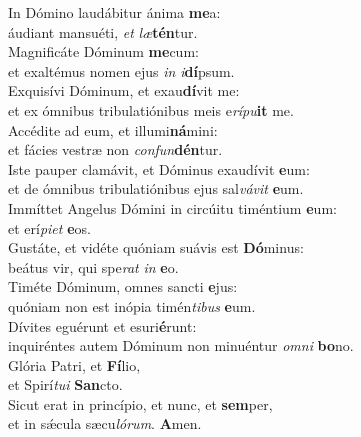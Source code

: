 \evenverse In Dómino laudábitur ánima \textbf{me}a:~\*\\
\evenverse áudiant mansuéti, \textit{et} \textit{læ}\textbf{tén}tur.\\
\oddverse Magnificáte Dóminum \textbf{me}cum:~\*\\
\oddverse et exaltémus nomen ejus \textit{in} \textit{i}\textbf{dí}psum.\\
\evenverse Exquisívi Dóminum, et exau\textbf{dí}vit me:~\*\\
\evenverse et ex ómnibus tribulatiónibus meis e\textit{rí}\textit{pu}\textbf{it} me.\\
\oddverse Accédite ad eum, et illumi\textbf{ná}mini:~\*\\
\oddverse et fácies vestræ non \textit{con}\textit{fun}\textbf{dén}tur.\\
\evenverse Iste pauper clamávit, et Dóminus exaudívit \textbf{e}um:~\*\\
\evenverse et de ómnibus tribulatiónibus ejus sal\textit{vá}\textit{vit} \textbf{e}um.\\
\oddverse Immíttet Angelus Dómini in circúitu timéntium \textbf{e}um:~\*\\
\oddverse et erí\textit{pi}\textit{et} \textbf{e}os.\\
\evenverse Gustáte, et vidéte quóniam suávis est \textbf{Dó}minus:~\*\\
\evenverse beátus vir, qui spe\textit{rat} \textit{in} \textbf{e}o.\\
\oddverse Timéte Dóminum, omnes sancti \textbf{e}jus:~\*\\
\oddverse quóniam non est inópia timén\textit{ti}\textit{bus} \textbf{e}um.\\
\evenverse Dívites eguérunt et esuri\textbf{é}runt:~\*\\
\evenverse inquiréntes autem Dóminum non minuéntur \textit{om}\textit{ni} \textbf{bo}no.\\
\oddverse Glória Patri, et \textbf{Fí}lio,~\*\\
\oddverse et Spirí\textit{tu}\textit{i} \textbf{San}cto.\\
\evenverse Sicut erat in princípio, et nunc, et \textbf{sem}per,~\*\\
\evenverse et in sǽcula sæcu\textit{ló}\textit{rum}. \textbf{A}men.\\
